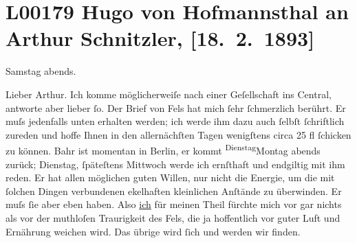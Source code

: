 

\section[Hugo von Hofmannsthal an Arthur Schnitzler, {[}18. 2. 1893{]}]{L00179 Hugo von Hofmannsthal an Arthur Schnitzler, {[}18. 2. 1893{]}}
\nopagebreak{}
\rehead{ }\normalsize\beginnumbering{}
\toendnotes[C]{\smallbreak\pagebreak[2]}
\pstart
           \raggedleft{}{\pb}Samstag abends.\pend
           
\pstart\center{}Lieber Arthur.\pend\vspace{0.5em}
\pstart
           Ich komme möglicherweiſe nach einer Geſellschaft ins Central, antworte aber lieber ſo. Der Brief von Fels hat mich ſehr ſchmerzlich berührt. Er muſs jedenfalls
               unten erhalten werden; ich werde ihm dazu auch ſelbſt ſchriftlich zureden und hoffe
               Ihnen in den allernächſten Tagen wenigſtens circa 25 fl ſchicken zu können. Bahr ist momentan in Berlin, {\pb}er
               kommt \substVorne{}\textsuperscript{Dienstag}\substDazwischen{}Montag\substHinten{} abends zurück; Dienstag, ſpäteſtens Mittwoch werde ich ernſthaft und
               endgiltig mit ihm reden. Er hat allen möglichen guten Willen, nur nicht die Energie,
               um die mit ſolchen Dingen verbundenen ekelhaften kleinlichen Anſtände zu überwinden.
               Er muſs ſie aber eben haben. Also \uline{ich} für meinen
               Theil fürchte mich vor gar nichts als vor der muthloſen {\pb}Traurigkeit des Fels, die ja hoffentlich vor guter Luft und Ernährung weichen
               wird. Das übrige wird ſich und werden wir finden.\pend
           
